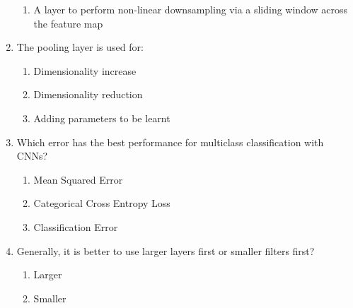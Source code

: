 \documentclass{report}
\numberwithin{equation}{section}
\begin{document}
\begin{enumerate}
\begin{enumerate}[label=\alph*.]
\item A layer to perform non-linear downsampling via a sliding window across the feature map
\end{enumerate}
\item The pooling layer is used for:
\begin{enumerate}[label=\alph*.]
\item Dimensionality increase
\item Dimensionality reduction
\item Adding parameters to be learnt
\end{enumerate}
\item Which error has the best performance for multiclass classification with CNNs?
\begin{enumerate}[label=\alph*.]
\item Mean Squared Error
\item Categorical Cross Entropy Loss
\item Classification Error
\end{enumerate}
\item Generally, it is better to use larger layers first or smaller filters first?
\begin{enumerate}[label=\alph*.]
\item Larger
\item Smaller
\end{enumerate}
\end{enumerate}
\end{document}
